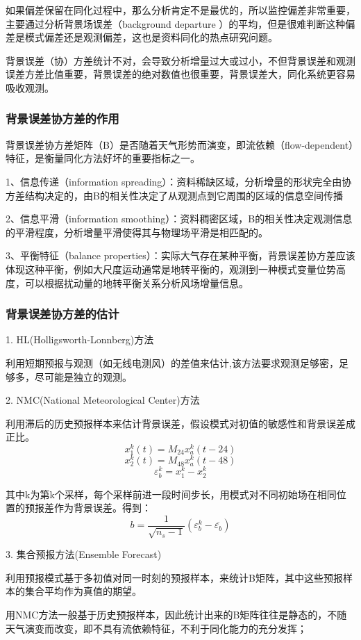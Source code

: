 \documentclass{article}
\begin{document}
如果偏差保留在同化过程中，那么分析肯定不是最优的，所以监控偏差非常重要，主要通过分析背景场误差（background departure ）的平均，但是很难判断这种偏差是模式偏差还是观测偏差，这也是资料同化的热点研究问题。

背景误差（协）方差统计不对，会导致分析增量过大或过小，不但背景误差和观测误差方差比值重要，背景误差的绝对数值也很重要，背景误差大，同化系统更容易吸收观测。

\subsubsection{背景误差协方差的作用}
背景误差协方差矩阵（B）是否随着天气形势而演变，即流依赖（flow-dependent）特征，是衡量同化方法好坏的重要指标之一。

1、信息传递（information spreading）：资料稀缺区域，分析增量的形状完全由协方差结构决定的，由B的相关性决定了从观测点到它周围的区域的信息空间传播

2、信息平滑（information smoothing）：资料稠密区域，B的相关性决定观测信息的平滑程度，分析增量平滑使得其与物理场平滑是相匹配的。

3、平衡特征（balance properties）：实际大气存在某种平衡，背景误差协方差应该体现这种平衡，例如大尺度运动通常是地转平衡的，观测到一种模式变量位势高度，可以根据扰动量的地转平衡关系分析风场增量信息。

\subsubsection{背景误差协方差的估计}
1. HL(Holligsworth-Lonnberg)方法

利用短期预报与观测（如无线电测风）的差值来估计,该方法要求观测足够密，足够多，尽可能是独立的观测。

2. NMC(National Meteorological Center)方法

利用滞后的历史预报样本来估计背景误差，假设模式对初值的敏感性和背景误差成正比。
$$x_1^k(t) = M_{24}x_a^{k}(t-24)$$
$$x_2^k(t) = M_{48}x_a^{k}(t-48)$$
$$\varepsilon_b^{k} = x_1^k - x_2^k$$

其中k为第k个采样，每个采样前进一段时间步长，用模式对不同初始场在相同位置的预报差作为背景误差。得到：
$$b = \frac{1}{\sqrt{n_s - 1}}(\varepsilon^k_b - \overline{\varepsilon_b})$$


3. 集合预报方法(Ensemble Forecast)

利用预报模式基于多初值对同一时刻的预报样本，来统计B矩阵，其中这些预报样本的集合平均作为真值的期望。

用NMC方法一般基于历史预报样本，因此统计出来的B矩阵往往是静态的，不随天气演变而改变，即不具有流依赖特征，不利于同化能力的充分发挥；
\end{document}
